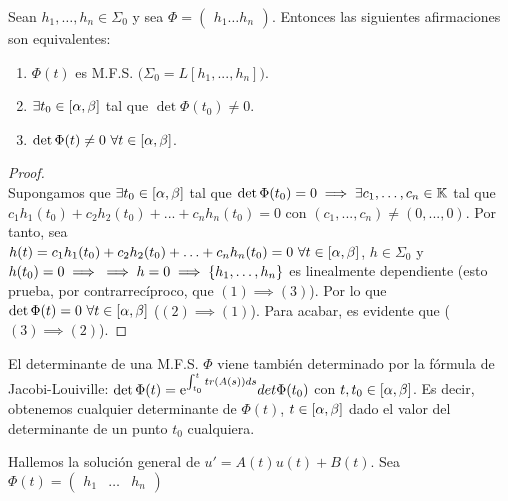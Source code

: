 \begin{teor}
Sean $h_1,\hdots,h_n \in \Sigma_0$ y sea $\Phi=\begin{pmatrix} h_1 \hdots h_n \end{pmatrix}$. Entonces las siguientes afirmaciones son equivalentes:
\begin{enumerate}[1.]
\item $\Phi(t)$ es M.F.S. $\big(\Sigma_0 = L[h_1,..., h_n]\big)$.
\item $\exists t_0 \in \alphabeta$ tal que $\det\Phi(t_0)\neq 0$.
\item $\det\Phi(t)\neq 0 \ \forall t \in \alphabeta$.
\end{enumerate}
\begin{proof}\ \\
Supongamos que $\exists t_0 \in \alphabeta$ tal que $\det\Phi(t_0)=0 \implies \exists c_1,\hdots,c_n \in \K$ tal que\\
$c_1h_1(t_0)+c_2h_2(t_0)+ ... + c_nh_n(t_0)=0$ con $(c_1,...,c_n)\neq(0,...,0)$. Por tanto, sea\\
$h(t)=c_1h_1(t_0)+c_2h_2(t_0)+ \hdots + c_nh_n(t_0)=0 \ \forall t \in \alphabeta$, $h \in \Sigma_0$ y $h(t_0)=0 \implies\\
\implies h=0 \implies \{h_1,\hdots,h_n\}$ es linealmente dependiente (esto prueba, por contrarrecíproco, que $(1)\implies (3)$). Por lo que $\det\Phi(t)=0 \ \forall t \in \alphabeta$ ($(2)\implies(1)$). Para acabar, es evidente que ($(3)\implies(2)$).
\end{proof}
\end{teor}

\begin{proposicion}
El determinante de una M.F.S. $\Phi$ viene también determinado por la fórmula de Jacobi-Louiville: $\det\Phi(t)=\e^{\inte{t}{t_0}tr(A(s))ds}det\Phi(t_0)$ con $t,t_0 \in \alphabeta$. Es decir, obtenemos cualquier determinante de $\Phi(t)$, $t\in\alphabeta$ dado el valor del determinante de un punto $t_0$ cualquiera.
\end{proposicion}

\begin{observacion}
Hallemos la solución general de $u'= A(t)u(t) + B(t)$.
Sea $\Phi(t)=\begin{pmatrix} h_1 & \hdots & h_n \end{pmatrix}$ 

\end{observacion}

